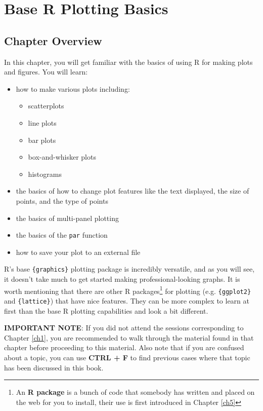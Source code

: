 \documentclass[]{book}
\providecommand{\tightlist}{%
  \setlength{\itemsep}{0pt}\setlength{\parskip}{0pt}}
\let\rmarkdownfootnote\footnote%
\def\footnote{\protect\rmarkdownfootnote}
\theoremstyle{definition}
\theoremstyle{definition}
\theoremstyle{definition}
\theoremstyle{remark}
\begin{document}
\chapter{Base R Plotting Basics}\label{ch2}

\section*{Chapter Overview}\label{chapter-overview-1}

In this chapter, you will get familiar with the basics of using R for
making plots and figures. You will learn:

\begin{itemize}
\tightlist
\item
  how to make various plots including:

  \begin{itemize}
  \tightlist
  \item
    scatterplots
  \item
    line plots
  \item
    bar plots
  \item
    box-and-whisker plots
  \item
    histograms
  \end{itemize}
\item
  the basics of how to change plot features like the text displayed, the
  size of points, and the type of points
\item
  the basics of multi-panel plotting
\item
  the basics of the \texttt{par} function
\item
  how to save your plot to an external file
\end{itemize}

R's base \texttt{\{graphics\}} plotting package is incredibly versatile,
and as you will see, it doesn't take much to get started making
professional-looking graphs. It is worth mentioning that there are other
R packages\footnote{An \textbf{R package} is a bunch of code that
  somebody has written and placed on the web for you to install, their
  use is first introduced in Chapter \ref{ch5}} for plotting (e.g.
\texttt{\{ggplot2\}} and \texttt{\{lattice\}}) that have nice features.
They can be more complex to learn at first than the base R plotting
capabilities and look a bit different.

\textbf{IMPORTANT NOTE}: If you did not attend the sessions
corresponding to Chapter \ref{ch1}, you are recommended to walk through
the material found in that chapter before proceeding to this material.
Also note that if you are confused about a topic, you can use
\textbf{CTRL + F} to find previous cases where that topic has been
discussed in this book.
\end{document}
